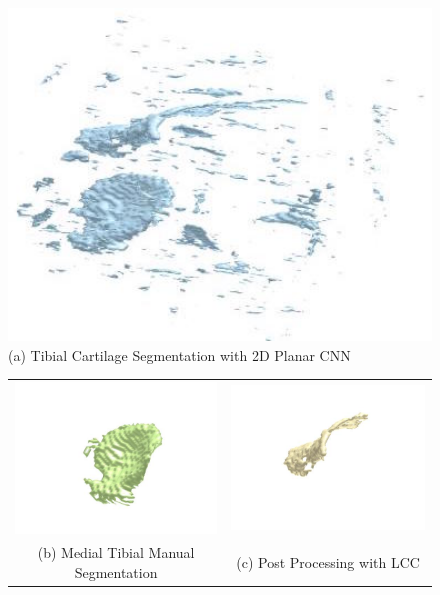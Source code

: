 \documentclass[11pt,a4paper]{memoir}
\numberwithin{figure}{section}
\numberwithin{table}{section}
\numberwithin{equation}{section}
\begin{document}
\begin{figure}[!h]
\centering
 \includegraphics[width=120mm]{plan-seg.jpg}\\
 \centering
 (a) Tibial Cartilage Segmentation with 2D Planar CNN\\
 \begin{adjustwidth}{-1.5cm}{}
\begin{tabular}{cc}
  \includegraphics[width=80mm]{lab1.jpg} &   \includegraphics[width=80mm]{planlcc.jpg} \\
(b) Medial Tibial Manual Segmentation & (c) Post Processing with LCC\\


\end{tabular}
\end{adjustwidth}
\end{figure}
\end{document}
